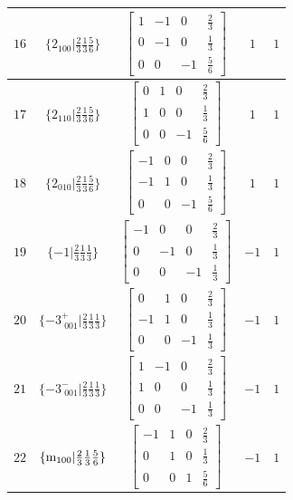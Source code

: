 \documentclass[fleqn,8pt]{jsarticle}
\begin{document}
\begin{longtable}{ccccc}
$ 16 $ & $ \{2{}_{100}|\frac{2}{3} \frac{1}{3} \frac{5}{6}\} $ & $ \begin{bmatrix} 1 & -1 & 0 & \frac{2}{3} \\ 0 & -1 & 0 & \frac{1}{3} \\ 0 & 0 & -1 & \frac{5}{6} \end{bmatrix} $ & $ 1 $ & $ 1 $ \\ \hline
$ 17 $ & $ \{2{}_{110}|\frac{2}{3} \frac{1}{3} \frac{5}{6}\} $ & $ \begin{bmatrix} 0 & 1 & 0 & \frac{2}{3} \\ 1 & 0 & 0 & \frac{1}{3} \\ 0 & 0 & -1 & \frac{5}{6} \end{bmatrix} $ & $ 1 $ & $ 1 $ \\ \hline
$ 18 $ & $ \{2{}_{010}|\frac{2}{3} \frac{1}{3} \frac{5}{6}\} $ & $ \begin{bmatrix} -1 & 0 & 0 & \frac{2}{3} \\ -1 & 1 & 0 & \frac{1}{3} \\ 0 & 0 & -1 & \frac{5}{6} \end{bmatrix} $ & $ 1 $ & $ 1 $ \\ \hline
$ 19 $ & $ \{-1|\frac{2}{3} \frac{1}{3} \frac{1}{3}\} $ & $ \begin{bmatrix} -1 & 0 & 0 & \frac{2}{3} \\ 0 & -1 & 0 & \frac{1}{3} \\ 0 & 0 & -1 & \frac{1}{3} \end{bmatrix} $ & $ -1 $ & $ 1 $ \\ \hline
$ 20 $ & $ \{-3^{+}_{\,\,001}|\frac{2}{3} \frac{1}{3} \frac{1}{3}\} $ & $ \begin{bmatrix} 0 & 1 & 0 & \frac{2}{3} \\ -1 & 1 & 0 & \frac{1}{3} \\ 0 & 0 & -1 & \frac{1}{3} \end{bmatrix} $ & $ -1 $ & $ 1 $ \\ \hline
$ 21 $ & $ \{-3^{-}_{\,\,001}|\frac{2}{3} \frac{1}{3} \frac{1}{3}\} $ & $ \begin{bmatrix} 1 & -1 & 0 & \frac{2}{3} \\ 1 & 0 & 0 & \frac{1}{3} \\ 0 & 0 & -1 & \frac{1}{3} \end{bmatrix} $ & $ -1 $ & $ 1 $ \\ \hline
$ 22 $ & $ \{{\rm m}_{100}|\frac{2}{3} \frac{1}{3} \frac{5}{6}\} $ & $ \begin{bmatrix} -1 & 1 & 0 & \frac{2}{3} \\ 0 & 1 & 0 & \frac{1}{3} \\ 0 & 0 & 1 & \frac{5}{6} \end{bmatrix} $ & $ -1 $ & $ 1 $ \\ \hline

\end{longtable}
\end{document}
